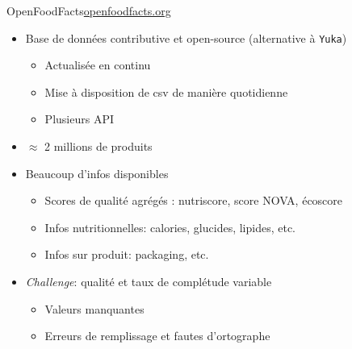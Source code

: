\documentclass[ignorenonframetext,]{beamer}
\begin{document}
\begin{frame}{OpenFoodFacts}{\href{https://fr.openfoodfacts.org}{openfoodfacts.org}}

\begin{itemize}
    \item Base de données contributive et open-source (alternative à \texttt{Yuka})
\begin{itemize}
    \item Actualisée en continu
    \item Mise à disposition de csv de manière quotidienne
    \item Plusieurs API
\end{itemize}
    \item $\approx$ 2 millions de produits
    \item Beaucoup d'infos disponibles
\begin{itemize}
    \item Scores de qualité agrégés : nutriscore, score NOVA, écoscore
    \item Infos nutritionnelles: calories, glucides, lipides, etc.
    \item Infos sur produit: packaging, etc.
\end{itemize}
    \item \textit{Challenge}:  qualité et taux de complétude variable
\begin{itemize}
    \item Valeurs manquantes
    \item Erreurs de remplissage et fautes d'ortographe
\end{itemize}
\end{itemize}
\end{frame}
\end{document}

